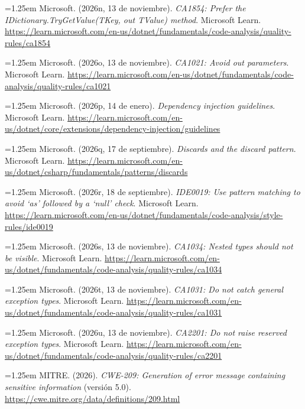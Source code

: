 \smallskip
\noindent\hangindent=1.25em Microsoft. (2026n, 13 de noviembre). \textit{CA1854: Prefer the IDictionary.TryGetValue(TKey, out TValue) method}. Microsoft Learn. \url{https://learn.microsoft.com/en-us/dotnet/fundamentals/code-analysis/quality-rules/ca1854}

\smallskip
\noindent\hangindent=1.25em Microsoft. (2026o, 13 de noviembre). \textit{CA1021: Avoid out parameters}. Microsoft Learn. \url{https://learn.microsoft.com/en-us/dotnet/fundamentals/code-analysis/quality-rules/ca1021}

\smallskip
\noindent\hangindent=1.25em Microsoft. (2026p, 14 de enero). \textit{Dependency injection guidelines}. Microsoft Learn. \url{https://learn.microsoft.com/en-us/dotnet/core/extensions/dependency-injection/guidelines}

\smallskip
\noindent\hangindent=1.25em Microsoft. (2026q, 17 de septiembre). \textit{Discards and the discard pattern}. Microsoft Learn. \url{https://learn.microsoft.com/en-us/dotnet/csharp/fundamentals/patterns/discards}

\smallskip
\noindent\hangindent=1.25em Microsoft. (2026r, 18 de septiembre). \textit{IDE0019: Use pattern matching to avoid `as' followed by a `null' check}. Microsoft Learn. \url{https://learn.microsoft.com/en-us/dotnet/fundamentals/code-analysis/style-rules/ide0019}

\smallskip
\noindent\hangindent=1.25em Microsoft. (2026s, 13 de noviembre). \textit{CA1034: Nested types should not be visible}. Microsoft Learn. \url{https://learn.microsoft.com/en-us/dotnet/fundamentals/code-analysis/quality-rules/ca1034}

\smallskip
\noindent\hangindent=1.25em Microsoft. (2026t, 13 de noviembre). \textit{CA1031: Do not catch general exception types}. Microsoft Learn. \url{https://learn.microsoft.com/en-us/dotnet/fundamentals/code-analysis/quality-rules/ca1031}

\smallskip
\noindent\hangindent=1.25em Microsoft. (2026u, 13 de noviembre). \textit{CA2201: Do not raise reserved exception types}. Microsoft Learn. \url{https://learn.microsoft.com/en-us/dotnet/fundamentals/code-analysis/quality-rules/ca2201}

\smallskip
\noindent\hangindent=1.25em MITRE. (2026). \textit{CWE-209: Generation of error message containing sensitive information} (versión 5.0). \url{https://cwe.mitre.org/data/definitions/209.html}

